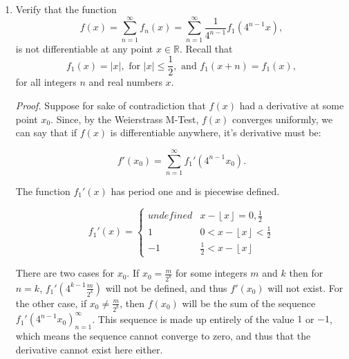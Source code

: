 \documentclass[10pt]{article}
\theoremstyle{plain}
\theoremstyle{remark}
\begin{document}
\begin{enumerate}
  \item Verify that the function
\begin{equation*}
  f (x) = \sum_{n = 1}^\infty f_n (x) = \sum_{n = 1}^\infty \frac{1}{4^{n-1}} f_1 \left( 4^{n-1} x \right),
\end{equation*}
is not differentiable at any point $x \in \mathbb{R}$.  Recall that
\begin{equation*}
  f_1 (x) = |x|, \text{ for } |x| \leq \frac{1}{2}, \text{ and } f_1 (x + n) = f_1 (x),
\end{equation*}
for all integers $n$ and real numbers $x$.

\textit{Proof.} Suppose for sake of contradiction that $f(x)$ had a derivative at some point $x_0$. Since, by the
Weierstrass M-Test, $f(x)$ converges uniformly, we can say that if $f(x)$ is differentiable anywhere, it's derivative
must be:

\begin{equation*}
  f'(x_0) = \sum_{n=1}^\infty f_1'\left( 4^{n-1} x_0 \right).
\end{equation*}

The function $f_1'(x)$ has period one and is piecewise defined.

\begin{equation*}
f_1'(x)=
 \begin{cases}
      undefined & x - \left \lfloor{x}\right \rfloor  = 0,\frac{1}{2} \\
       1 & 0 < x - \left \lfloor{x}\right \rfloor < \frac{1}{2} \\
      -1 & \frac{1}{2} < x -\left \lfloor{x}\right \rfloor
   \end{cases}
\end{equation*}

There are two cases for $x_0$. If $x_0 = \frac{m}{2^k}$ for some integers $m$ and $k$ then for $n = k$,
$f_1'(4^{k-1}\frac{m}{2^k})$ will not be defined, and thus $f'(x_0)$ will not exist. For the other case, if
$x_0 \neq \frac{m}{2^k}$, then $f(x_0)$ will be the sum of the sequence $f_1'(4^{n-1}x_0)_{n=1}^{\infty}$. This sequence
is made up entirely of the value $1$ or $-1$, which means the sequence cannot converge to zero, and thus that the
derivative cannot exist here either.
\end{enumerate}
\end{document}
